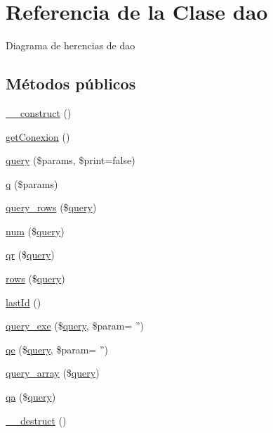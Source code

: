 \hypertarget{classdao}{\section{Referencia de la Clase dao}
\label{classdao}
}


Diagrama de herencias de dao
\subsection*{Métodos públicos}
\begin{DoxyCompactItemize}
\item 
\hyperlink{classdao_a095c5d389db211932136b53f25f39685}{\-\_\-\-\_\-construct} ()
\item 
\hyperlink{classdao_a1281a83961eb5b3154684661b7bb64fd}{get\-Conexion} ()
\item 
\hyperlink{classdao_a575ab1ea1c3c8d291f679d66732577f2}{query} (\$params, \$print=false)
\item 
\hyperlink{classdao_a57b42422089be85e61d4482406f050eb}{q} (\$params)
\item 
\hyperlink{classdao_a1c50ed902c43f3060cefae287fe9bc42}{query\-\_\-rows} (\$\hyperlink{classdao_a575ab1ea1c3c8d291f679d66732577f2}{query})
\item 
\hyperlink{classdao_a9ce03691b97623e06038faa287e869e0}{num} (\$\hyperlink{classdao_a575ab1ea1c3c8d291f679d66732577f2}{query})
\item 
\hyperlink{classdao_ab56bd29d6b4b00cbf3e95edf875603a5}{qr} (\$\hyperlink{classdao_a575ab1ea1c3c8d291f679d66732577f2}{query})
\item 
\hyperlink{classdao_ae94c38578a427fe7ded34c092005265f}{rows} (\$\hyperlink{classdao_a575ab1ea1c3c8d291f679d66732577f2}{query})
\item 
\hyperlink{classdao_a27993b901efcccbdbb2738ffdec18f16}{last\-Id} ()
\item 
\hyperlink{classdao_a3f03bc98b3a3ca0dc3a946f626ba04bc}{query\-\_\-exe} (\$\hyperlink{classdao_a575ab1ea1c3c8d291f679d66732577f2}{query}, \$param= '')
\item 
\hyperlink{classdao_a1b58b1e4fcc51e778fe856562614812f}{qe} (\$\hyperlink{classdao_a575ab1ea1c3c8d291f679d66732577f2}{query}, \$param= '')
\item 
\hyperlink{classdao_a4a983bd3dcad79de7a17c4acf584c714}{query\-\_\-array} (\$\hyperlink{classdao_a575ab1ea1c3c8d291f679d66732577f2}{query})
\item 
\hyperlink{classdao_a9ae085281d4bd36561f9786dd48be1b1}{qa} (\$\hyperlink{classdao_a575ab1ea1c3c8d291f679d66732577f2}{query})
\item 
\hyperlink{classdao_a421831a265621325e1fdd19aace0c758}{\-\_\-\-\_\-destruct} ()
\end{DoxyCompactItemize}
